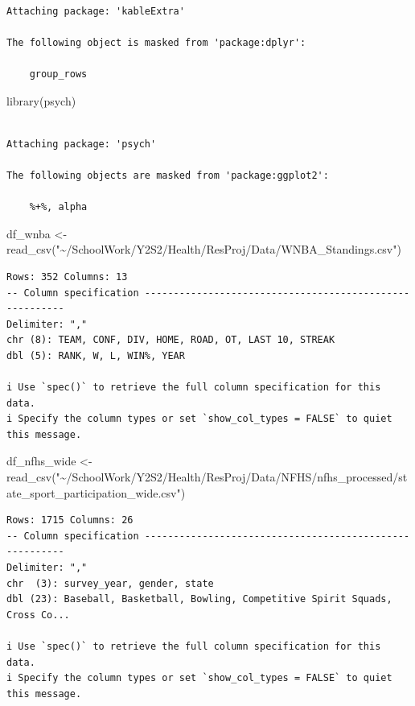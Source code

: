 \documentclass[
  letterpaper,
  DIV=11,
  numbers=noendperiod]{scrartcl}
\newenvironment{Shaded}{\begin{snugshade}}{\end{snugshade}}
\newcommand{\FunctionTok}[1]{\textcolor[rgb]{0.28,0.35,0.67}{#1}}
\newcommand{\NormalTok}[1]{\textcolor[rgb]{0.00,0.23,0.31}{#1}}
\newcommand{\OtherTok}[1]{\textcolor[rgb]{0.00,0.23,0.31}{#1}}
\newcommand{\StringTok}[1]{\textcolor[rgb]{0.13,0.47,0.30}{#1}}
\begin{document}
\begin{verbatim}

Attaching package: 'kableExtra'

The following object is masked from 'package:dplyr':

    group_rows
\end{verbatim}

\begin{Shaded}
\begin{Highlighting}[]
\FunctionTok{library}\NormalTok{(psych)}
\end{Highlighting}
\end{Shaded}

\begin{verbatim}

Attaching package: 'psych'

The following objects are masked from 'package:ggplot2':

    %+%, alpha
\end{verbatim}

\begin{Shaded}
\begin{Highlighting}[]
\NormalTok{df\_wnba }\OtherTok{\textless{}{-}} \FunctionTok{read\_csv}\NormalTok{(}\StringTok{"\textasciitilde{}/SchoolWork/Y2S2/Health/ResProj/Data/WNBA\_Standings.csv"}\NormalTok{)}
\end{Highlighting}
\end{Shaded}

\begin{verbatim}
Rows: 352 Columns: 13
-- Column specification --------------------------------------------------------
Delimiter: ","
chr (8): TEAM, CONF, DIV, HOME, ROAD, OT, LAST 10, STREAK
dbl (5): RANK, W, L, WIN%, YEAR

i Use `spec()` to retrieve the full column specification for this data.
i Specify the column types or set `show_col_types = FALSE` to quiet this message.
\end{verbatim}

\begin{Shaded}
\begin{Highlighting}[]
\NormalTok{df\_nfhs\_wide }\OtherTok{\textless{}{-}} \FunctionTok{read\_csv}\NormalTok{(}\StringTok{"\textasciitilde{}/SchoolWork/Y2S2/Health/ResProj/Data/NFHS/nfhs\_processed/state\_sport\_participation\_wide.csv"}\NormalTok{)}
\end{Highlighting}
\end{Shaded}

\begin{verbatim}
Rows: 1715 Columns: 26
-- Column specification --------------------------------------------------------
Delimiter: ","
chr  (3): survey_year, gender, state
dbl (23): Baseball, Basketball, Bowling, Competitive Spirit Squads, Cross Co...

i Use `spec()` to retrieve the full column specification for this data.
i Specify the column types or set `show_col_types = FALSE` to quiet this message.
\end{verbatim}
\end{document}
